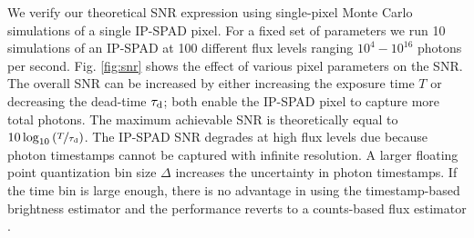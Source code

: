 \smallskip
{}
We verify our theoretical SNR expression using single-pixel Monte Carlo
simulations of a single IP-SPAD pixel. For a fixed set of parameters we run 10
simulations of an IP-SPAD at 100 different flux levels ranging $10^4-10^{16}$
photons per second. Fig. \ref{fig:snr} shows the effect of various pixel
parameters on the SNR. The overall SNR can be increased by either
increasing the exposure time $T$ or decreasing the dead-time $\tau_\text{d}$;
both enable the IP-SPAD pixel to capture more total
photons. The maximum achievable SNR is theoretically equal to
$10\log_{10}\left(\nicefrac{T}{\tau_\text{d}}\right)$. The IP-SPAD
SNR degrades at high flux levels due because photon timestamps cannot be
captured with infinite resolution.  A larger floating point quantization bin
size $\Delta$ increases the uncertainty in photon timestamps. If the time bin
is large enough, there is no advantage in using the timestamp-based brightness
estimator and the performance reverts to a counts-based flux estimator
\cite{Antolovic_2018, ingle2019high}. 




%

